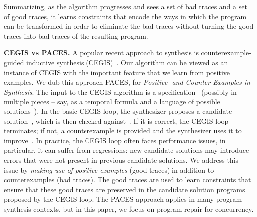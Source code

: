 \documentclass{llncs}
\begin{document}
Summarizing, as the algorithm progresses and sees a set of bad
traces and a set of good traces, it learns constraints that encode the ways
in which the program can be transformed in order to eliminate the 
bad traces without turning the good traces into bad traces of the
resulting program. 

\noindent
{\bf CEGIS vs PACES.}
A popular recent approach to synthesis is counterexample-guided 
inductive synthesis (CEGIS)~\cite{asplos06}.
Our algorithm can be viewed as an instance of CEGIS with the important
feature that we learn from positive examples.
We dub this approach PACES, for {\em Positive- and Counter-Examples in
Synthesis}.
The input to the CEGIS algorithm is a specification~ 
(possibly in multiple pieces -- say, as a temporal formula and a
language of possible solutions~\cite{sygus}).  
In the basic CEGIS loop, the synthesizer proposes a 
candidate solution~, which is then checked against~.  
If it is correct, the CEGIS loop terminates; if not, a counterexample is 
provided and the synthesizer uses it to improve~.
In practice, the CEGIS loop often faces performance issues, in particular, 
it can suffer from regressions: new candidate solutions may introduce 
errors that were not present in previous candidate solutions.
We address this issue by {\em making use of positive examples} (good 
traces) in addition to counterexamples (bad traces). The good traces
are used to learn constraints that ensure that these good traces are
preserved in the candidate solution programs proposed by the CEGIS loop. 
The PACES approach applies in many program synthesis contexts, but in
this paper, we focus on program repair for concurrency.
\end{document}
